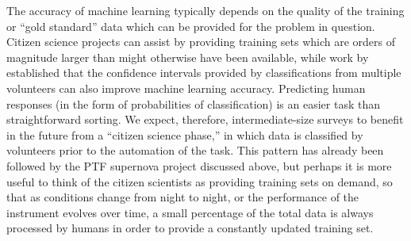 \documentclass{ar2e}
\begin{document}
The accuracy of machine learning typically depends on the quality of the
training or ``gold standard'' data which can be provided for the problem in
question. Citizen science projects can assist by providing training sets which
are orders of magnitude larger than might otherwise have been available, while
work by \citet{Banerji++2010} established that the confidence intervals provided
by classifications from multiple volunteers can also improve machine learning
accuracy.  Predicting human responses (in the form of probabilities of
classification) is an easier task than straightforward sorting. We expect,
therefore, intermediate-size surveys to benefit in the future from a ``citizen
science phase,'' in which data is classified by volunteers prior to the
automation of the task. This pattern has already been followed by the PTF
supernova project discussed above, but perhaps it is more useful to think of the
citizen scientists as providing training sets on demand, so that as conditions
change from night to night, or the performance of the instrument evolves over
time, a small percentage of the total data is always processed by humans in
order to provide a constantly updated training set. 
\end{document}
